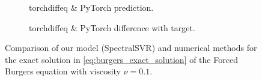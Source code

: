 \begin{figure}[H]
\begin{adjustwidth}{-0.05\linewidth}{-0.05\linewidth}
\begin{subfigure}{0.49\linewidth}
\begin{adjustbox}{width=\linewidth}
        
      \end{adjustbox}
      \caption{torchdiffeq \& PyTorch prediction.}\label{fig:comp_exact_tdo_pred_0.1}
    \end{subfigure}
    \begin{subfigure}{0.49\linewidth}
      \begin{adjustbox}{width=\linewidth}
        
      \end{adjustbox}
      \caption{torchdiffeq \& PyTorch difference with target.}\label{fig:comp_exact_tdo_diff_0.1}
    \end{subfigure}
  \end{adjustwidth}
  \caption{Comparison of our model (SpectralSVR) and numerical methods for the exact solution in \cref{eq:burgers_exact_solution} of the Forced Burgers equation with viscosity \(\nu=0.1\).}\label{fig:comparison_burgers_exact_0.1}
\end{figure}

